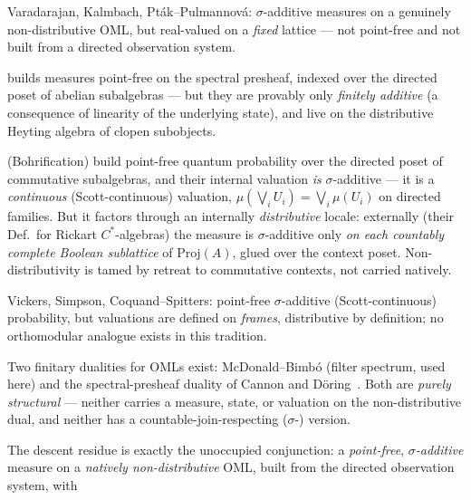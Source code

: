 \documentclass[11pt]{article}
\theoremstyle{definition}
\begin{document}
\begin{description}[style=nextline, font=\normalfont\bfseries,
    labelwidth=3cm, leftmargin=3.4cm]
  \item[Gleason tradition]
    Varadarajan, Kalmbach, Pt\'{a}k--Pulmannov\'{a}: $\sigma$-additive
    measures on a genuinely non-distributive OML, but real-valued on a
    \emph{fixed} lattice --- not point-free and not built from a
    directed observation system.
  \item[D\"{o}ring 2009]
    \cite{Doering2009measures} builds measures point-free on the
    spectral presheaf, indexed over the directed poset of abelian
    subalgebras --- but they are provably only \emph{finitely additive}
    (a consequence of linearity of the underlying state), and live on
    the distributive Heyting algebra of clopen subobjects.
  \item[Heunen--Landsman--Spitters]
    \cite{HeunenLandsmanSpitters2009, HeunenLandsmanSpitters2011}
    (Bohrification) build point-free quantum probability over the
    directed poset of commutative subalgebras, and their internal
    valuation \emph{is} $\sigma$-additive --- it is a \emph{continuous}
    (Scott-continuous) valuation, $\mu(\bigvee_i U_i) = \bigvee_i
    \mu(U_i)$ on directed families. But it factors through an internally
    \emph{distributive} locale: externally (their Def.~for Rickart
    $C^*$-algebras) the measure is $\sigma$-additive only \emph{on each
    countably complete Boolean sublattice} of $\mathrm{Proj}(A)$, glued
    over the context poset. Non-distributivity is tamed by retreat to
    commutative contexts, not carried natively.
  \item[Localic valuations]
    Vickers, Simpson, Coquand--Spitters: point-free $\sigma$-additive
    (Scott-continuous) probability, but valuations are defined on
    \emph{frames}, distributive by definition; no orthomodular analogue
    exists in this tradition.
  \item[OML Stone dualities]
    Two finitary dualities for OMLs exist: McDonald--Bimb\'{o}
    \cite{McDonaldBimbo2023} (filter spectrum, used here) and the
    spectral-presheaf duality of Cannon and
    D\"{o}ring~\cite{Cannon2013}. Both are \emph{purely structural} ---
    neither carries a measure, state, or valuation on the
    non-distributive dual, and neither has a countable-join-respecting
    ($\sigma$-) version.
\end{description}
The descent residue is exactly the unoccupied conjunction: a
\emph{point-free}, \emph{$\sigma$-additive} measure on a \emph{natively
non-distributive} OML, built from the directed observation system, with
\end{document}
